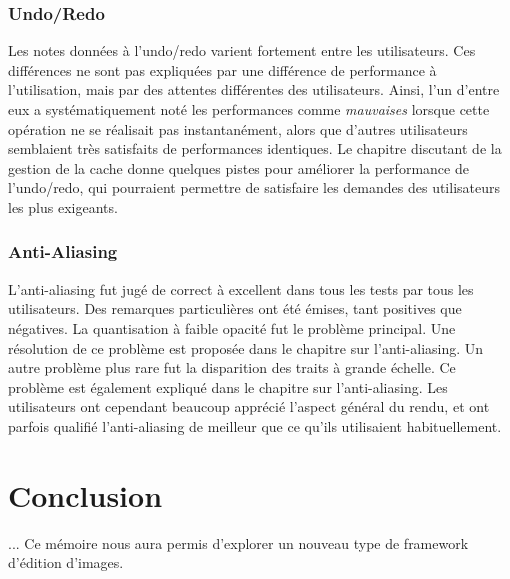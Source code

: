 		\subsection{Undo/Redo}
		Les notes données à l'undo/redo varient fortement entre les utilisateurs. Ces différences ne sont pas expliquées par une différence
		de performance à l'utilisation, mais par des attentes différentes des utilisateurs. Ainsi, l'un d'entre eux a systématiquement noté les performances
		comme \emph{mauvaises}  lorsque cette opération ne se réalisait pas instantanément, alors que d'autres utilisateurs semblaient très satisfaits
		de performances identiques. Le chapitre discutant de la gestion de la cache donne quelques pistes pour améliorer la performance 
		de l'undo/redo, qui pourraient permettre de satisfaire les demandes des utilisateurs les plus exigeants. 

		\subsection{Anti-Aliasing}
		L'anti-aliasing fut jugé de correct à excellent dans tous les tests par tous les utilisateurs. Des remarques particulières ont été émises,
		tant positives que négatives. La quantisation à faible opacité fut le problème principal. Une résolution de ce problème est
		proposée dans le chapitre sur l'anti-aliasing. Un autre problème plus rare fut la disparition des traits à grande échelle. Ce problème est
		également expliqué dans le chapitre sur l'anti-aliasing.  Les utilisateurs ont cependant beaucoup apprécié l'aspect général du rendu, et 
		ont parfois qualifié l'anti-aliasing de meilleur que ce qu'ils utilisaient habituellement.  
		
\chapter{Conclusion}
		...
		Ce mémoire nous aura permis 
		d'explorer un nouveau type de framework d'édition d'images. 

		
